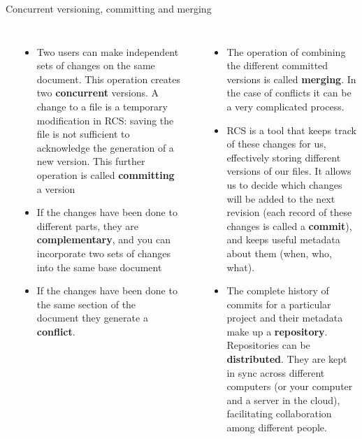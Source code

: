 \documentclass[english,aspectratio=169]{beamer}
\begin{document}
\begin{frame}{Concurrent versioning, committing and merging}
\begin{columns}[t]

\column{7cm}
\begin{center}

\par\end{center}
\begin{itemize}
\item \tiny{Two users can make independent sets of changes on the same
document. This operation creates two \textbf{concurrent} versions. A change to a file is a temporary modification in RCS: saving the file is not sufficient to acknowledge the generation of a new version. This further operation is called \textbf{committing} a version}
\item \tiny{If the changes have been done to different parts, they are
\textbf{complementary}, and you can incorporate two sets of changes into the same base document}
\item \tiny{If the changes have been done to the same section of the document
they generate a \textbf{conflict}. }
\end{itemize}

\column{7cm}
\begin{center}

\par\end{center}
\begin{itemize}
\item {\tiny{}The operation of combining the different committed versions
is called }\textbf{\tiny{}merging}{\tiny{}. In the case of conflicts it can be a very complicated process.}{\tiny\par}
\item {\tiny{}RCS is a tool that keeps track of these changes for us, effectively storing different versions of our files. It allows us to decide which changes will be added to the next revision (each record of these changes is called a }\textbf{\tiny{}commit}{\tiny{}), and
keeps useful metadata about them (when, who, what). }{\tiny\par}
\item {\tiny{}The complete history of commits for a particular project and their metadata make up a }\textbf{\tiny{}repository}{\tiny{}. Repositories
can be }\textbf{\tiny{}distributed}{\tiny{}. They are kept in sync across different computers (or your computer and a server in the cloud),
facilitating collaboration among different people.}{\tiny\par}
\end{itemize}
\end{columns}

\end{frame}
\end{document}
